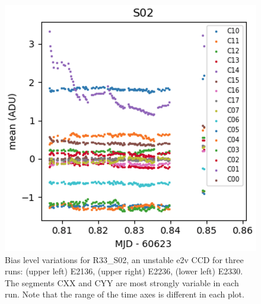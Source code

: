 \begin{figure}[htbp]
\vspace{0.05\textwidth}

\begin{minipage}[b]{0.45\textwidth}
    \centering
    \includegraphics[width=\textwidth]{sections/figures/E2330_R33_S02.png}
\end{minipage}
\hspace{0.05\textwidth}
\hfill
\begin{minipage}[b]{0.45\textwidth}
    \centering
\end{minipage}
\caption{Bias level variations for R33\_S02, an unstable e2v CCD for three runs:  (upper left) E2136, (upper right) E2236, (lower left) E2330.  The segments CXX and CYY are most strongly variable in each run.  Note that the range of the time axes is different in each plot.}
\label{fig:r33_s02_bias}
\end{figure}


%
%

